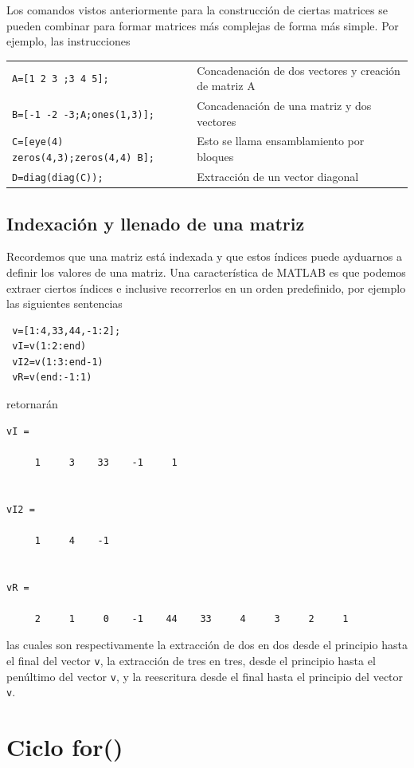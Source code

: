 \documentclass[11pt]{article}
\begin{document}
Los comandos vistos anteriormente para la construcci\'on de ciertas matrices se pueden combinar para formar matrices m\'as complejas de forma m\'as simple. Por ejemplo, las instrucciones

\begin{center}
\begin{tabular}{l|p{}}
\texttt{A=[1 2 3 ;3 4 5];}
	& Concadenaci\'on de dos vectores y creaci\'on de matriz A\\
\texttt{B=[-1 -2 -3;A;ones(1,3)];}
	&Concadenaci\'on de una matriz y dos vectores\\
\texttt{C=[eye(4) zeros(4,3);zeros(4,4) B];} 
	& Esto se llama ensamblamiento por bloques\\
\texttt{D=diag(diag(C));}
	& Extracci\'on de un vector diagonal\\
\end{tabular}
\end{center}

%
\subsection{Indexaci\'on y llenado de una matriz}
Recordemos que una matriz est\'a indexada y que estos \'indices puede ayduarnos a definir los valores de una matriz. 
Una caracter\'istica de MATLAB es que podemos extraer ciertos \'indices e inclusive recorrerlos en un orden predefinido, 
por ejemplo las siguientes sentencias
\begin{verbatim}
 v=[1:4,33,44,-1:2];
 vI=v(1:2:end)
 vI2=v(1:3:end-1)
 vR=v(end:-1:1)
\end{verbatim}
retornar\'an
\begin{verbatim}
vI =

     1     3    33    -1     1


vI2 =

     1     4    -1


vR =

     2     1     0    -1    44    33     4     3     2     1
\end{verbatim}
las cuales son respectivamente la extracci\'on de dos en dos desde el principio hasta el final del vector
\texttt{v}, la extracci\'on de tres en tres, desde el principio hasta el pen\'ultimo del vector \texttt{v},
y la reescritura desde el final hasta el principio del vector \texttt{v}.




\section{Ciclo for()}
\end{document}
